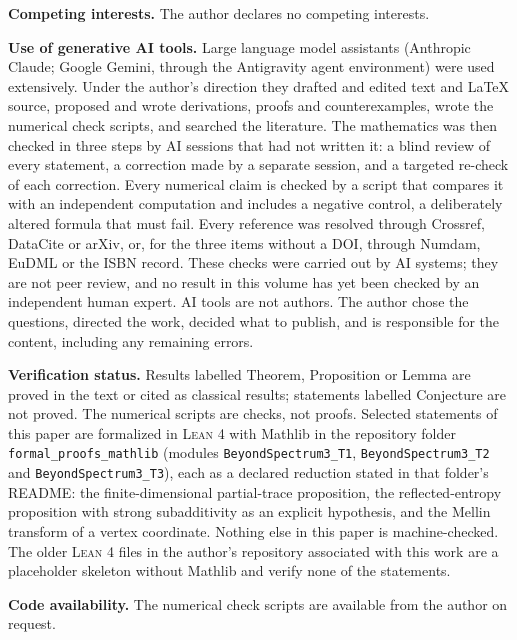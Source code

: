 \documentclass[11pt,a4paper,reqno]{amsart}
\theoremstyle{definition}
\theoremstyle{remark}
\numberwithin{equation}{section}
\begin{document}
\medskip\noindent\textbf{Competing interests.} The author declares no competing
interests.

\medskip\noindent\textbf{Use of generative AI tools.} Large language model
assistants (Anthropic Claude; Google Gemini, through the Antigravity agent
environment) were used extensively. Under the author's direction they drafted and
edited text and \LaTeX{} source, proposed and wrote derivations, proofs and
counterexamples, wrote the numerical check scripts, and searched the literature.
The mathematics was then checked in three steps by AI sessions that had not
written it: a blind review of every statement, a correction made by a separate
session, and a targeted re-check of each correction. Every numerical claim is
checked by a script that compares it with an independent computation and includes
a negative control, a deliberately altered formula that must fail. Every reference
was resolved through Crossref, DataCite or arXiv, or, for the three items without
a DOI, through Numdam, EuDML or the ISBN record. These checks were carried out by
AI systems; they are not peer review, and no result in this volume has yet
been checked by an independent human expert. AI tools are not authors. The author
chose the questions, directed the work, decided what to publish, and is
responsible for the content, including any remaining errors.

\medskip\noindent\textbf{Verification status.} Results labelled Theorem,
Proposition or Lemma are proved in the text or cited as classical results;
statements labelled Conjecture are not proved. The numerical scripts are checks,
not proofs. Selected statements of this paper are formalized in \textsc{Lean 4} with Mathlib in the repository folder \texttt{formal\_proofs\_mathlib} (modules \texttt{BeyondSpectrum3\_T1}, \texttt{BeyondSpectrum3\_T2} and \texttt{BeyondSpectrum3\_T3}), each as a declared reduction stated in that folder's README: the finite-dimensional partial-trace proposition, the reflected-entropy proposition with strong subadditivity as an explicit hypothesis, and the Mellin transform of a vertex coordinate. Nothing else in this paper is machine-checked. The older \textsc{Lean 4} files in the author's repository associated with
this work are a placeholder skeleton without Mathlib and verify none of the
statements.

\medskip\noindent\textbf{Code availability.} The numerical check scripts are
available from the author on request.
\end{document}
